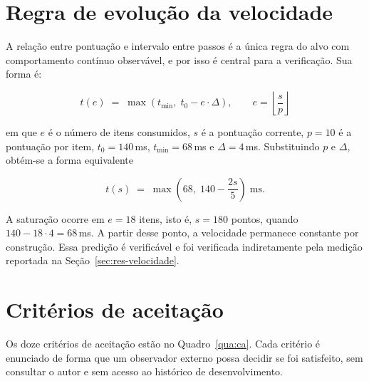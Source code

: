 \section{Regra de evolução da velocidade}
\label{sec:esp-velocidade}

A relação entre pontuação e intervalo entre passos é a única regra do alvo com
comportamento contínuo observável, e por isso é central para a verificação. Sua
forma é:

\begin{equation}
	t(e) \;=\; \max\!\left( t_{\min},\; t_0 - e \cdot \Delta \right),
	\qquad e = \left\lfloor \frac{s}{p} \right\rfloor
	\label{eq:velocidade}
\end{equation}

\noindent em que $e$ é o número de itens consumidos, $s$ é a pontuação corrente,
$p = 10$ é a pontuação por item, $t_0 = 140$\,ms, $t_{\min} = 68$\,ms e
$\Delta = 4$\,ms. Substituindo $p$ e $\Delta$, obtém-se a forma equivalente

\begin{equation}
	t(s) \;=\; \max\!\left( 68,\; 140 - \frac{2s}{5} \right) \;\text{ms}.
	\label{eq:velocidade-simplificada}
\end{equation}

\noindent A saturação ocorre em $e = 18$ itens, isto é, $s = 180$ pontos, quando
$140 - 18 \cdot 4 = 68$\,ms. A partir desse ponto, a velocidade permanece
constante por construção. Essa predição é verificável e foi verificada
indiretamente pela medição reportada na Seção~\ref{sec:res-velocidade}.

\section{Critérios de aceitação}
\label{sec:esp-ca}

Os doze critérios de aceitação estão no Quadro~\ref{qua:ca}. Cada critério é
enunciado de forma que um observador externo possa decidir se foi satisfeito,
sem consultar o autor e sem acesso ao histórico de desenvolvimento.

